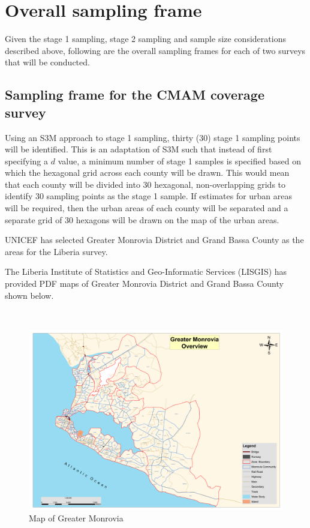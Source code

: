 \documentclass[12pt,a4paper]{book}
\theoremstyle{definition}
\theoremstyle{definition}
\theoremstyle{definition}
\theoremstyle{remark}
\begin{document}
\hypertarget{samplingframe}{%
\section{Overall sampling frame}\label{samplingframe}}

Given the stage 1 sampling, stage 2 sampling and sample size
considerations described above, following are the overall sampling
frames for each of two surveys that will be conducted.

\hypertarget{sampling-frame-for-the-cmam-coverage-survey}{%
\subsection{Sampling frame for the CMAM coverage
survey}\label{sampling-frame-for-the-cmam-coverage-survey}}

Using an S3M approach to stage 1 sampling, thirty (30) stage 1 sampling
points will be identified. This is an adaptation of S3M such that
instead of first specifying a \(d\) value, a minimum number of stage 1
samples is specified based on which the hexagonal grid across each
county will be drawn. This would mean that each county will be divided
into 30 hexagonal, non-overlapping grids to identify 30 sampling points
as the stage 1 sample. If estimates for urban areas will be required,
then the urban areas of each county will be separated and a separate
grid of 30 hexagons will be drawn on the map of the urban areas.

UNICEF has selected Greater Monrovia District and Grand Bassa County as
the areas for the Liberia survey.

The Liberia Institute of Statistics and Geo-Informatic Services (LISGIS)
has provided PDF maps of Greater Monrovia District and Grand Bassa
County shown below.

~

\begin{figure}[H]

{\centering \includegraphics[width=0.8\linewidth]{figures/greaterMonroviaEA} 

}

\caption{Map of Greater Monrovia}\label{fig:sample20}
\end{figure}
\end{document}
